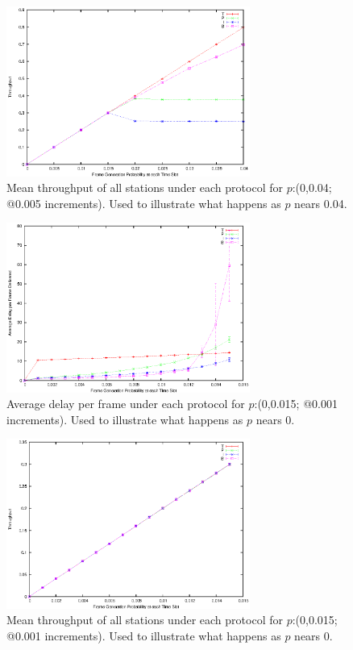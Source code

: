 \documentclass[twocolumn]{article}
\begin{document}
\begin{figure}
    \centering
    \includegraphics[width=8cm]{plots/throughput_big.eps}
    \caption{\footnotesize Mean throughput of all stations under each protocol for $p$:(0,0.04; @0.005 increments). Used to illustrate what happens as $p$ nears 0.04.}
    \label{fig:throughput_big}
\end{figure}

\begin{figure}
    \centering
    \includegraphics[width=8cm]{plots/small_delay.eps}
    \caption{\footnotesize Average delay per frame under each protocol for $p$:(0,0.015; @0.001 increments). Used to illustrate what happens as $p$ nears 0.}
    \label{fig:delay_small}
\end{figure}

\begin{figure}
    \centering
    \includegraphics[width=8cm]{plots/small_throughput.eps}
    \caption{\footnotesize Mean throughput of all stations under each protocol for $p$:(0,0.015; @0.001 increments). Used to illustrate what happens as $p$ nears 0.}
    \label{fig:throughput_small}
\end{figure}
\end{document}
